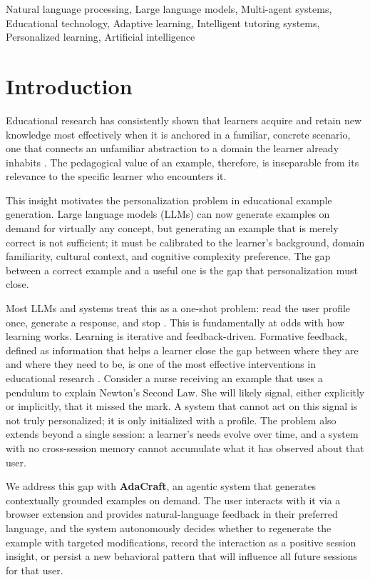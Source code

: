 \documentclass[conference]{IEEEtran}
\begin{document}
\begin{IEEEkeywords}
Natural language processing, Large language models, Multi-agent systems, Educational technology, Adaptive learning, Intelligent tutoring systems, Personalized learning, Artificial intelligence
\end{IEEEkeywords}


\section{Introduction}

Educational research has consistently shown that learners acquire and retain new knowledge most effectively when it is anchored in a familiar, concrete scenario, one that connects an unfamiliar abstraction to a domain the learner already inhabits \cite{b6}. The pedagogical value of an example, therefore, is inseparable from its relevance to the specific learner who encounters it.

This insight motivates the personalization problem in educational example generation. Large language models (LLMs) can now generate examples on demand for virtually any concept, but generating an example that is merely correct is not sufficient; it must be calibrated to the learner's background, domain familiarity, cultural context, and cognitive complexity preference. The gap between a correct example and a useful one is the gap that personalization must close.

Most LLMs and systems treat this as a one-shot problem: read the user profile once, generate a response, and stop \cite{b1, b2}. This is fundamentally at odds with how learning works. Learning is iterative and feedback-driven. Formative feedback, defined as information that helps a learner close the gap between where they are and where they need to be, is one of the most effective interventions in educational research \cite{b7}. Consider a nurse receiving an example that uses a pendulum to explain Newton's Second Law. She will likely signal, either explicitly or implicitly, that it missed the mark. A system that cannot act on this signal is not truly personalized; it is only initialized with a profile. The problem also extends beyond a single session: a learner's needs evolve over time, and a system with no cross-session memory cannot accumulate what it has observed about that user.

We address this gap with \textbf{AdaCraft}, an agentic system that generates contextually grounded examples on demand. The user interacts with it via a browser extension and provides natural-language feedback in their preferred language, and the system autonomously decides whether to regenerate the example with targeted modifications, record the interaction as a positive session insight, or persist a new behavioral pattern that will influence all future sessions for that user.
\end{document}
